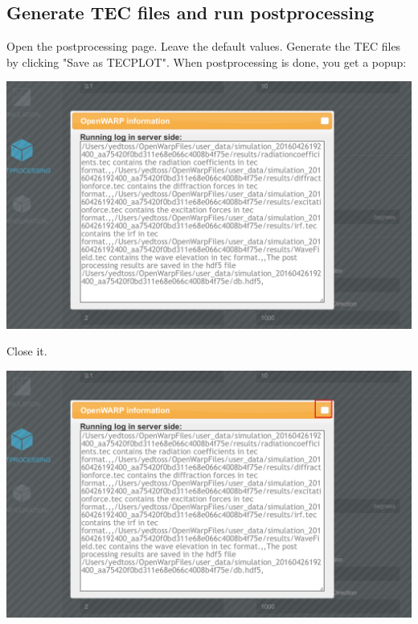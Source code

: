 \documentclass[12pt]{article}
\begin{document}
\subsection{Generate TEC files and run postprocessing}

Open the postprocessing page.
Leave the default values. Generate the TEC files by clicking "Save as TECPLOT". When postprocessing is done, you get a popup:

\vspace{\abovedisplayskip}
\begin{minipage}{\linewidth}
	\centering
	\includegraphics[scale=0.5]{img/53}
\end{minipage}
\vspace{\belowdisplayskip}

Close it.

\vspace{\abovedisplayskip}
\begin{minipage}{\linewidth}
	\centering
	\includegraphics[scale=0.5]{img/54}
\end{minipage}
\vspace{\belowdisplayskip}
\end{document}

